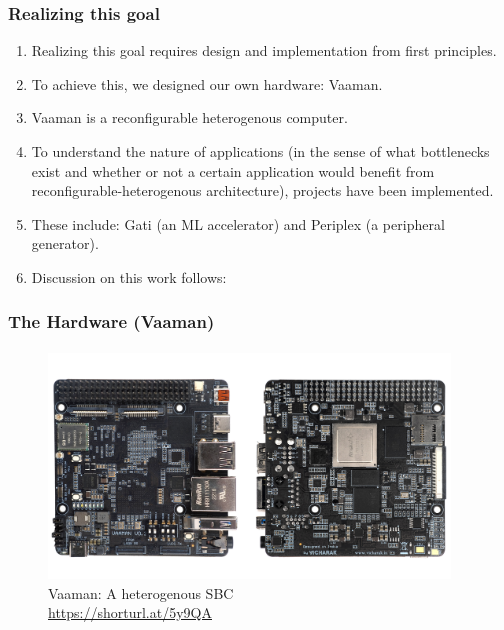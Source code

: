 \documentclass{beamer}
\begin{document}
{\begin{frame}[fragile]
  \frametitle{Realizing this goal}
  \begin{enumerate}
    \item Realizing this goal requires design and implementation from
      first principles.
    \item To achieve this, we designed our own hardware: Vaaman. 
    \item Vaaman is a reconfigurable heterogenous computer.
    \item To understand the nature of applications (in the sense of what
      bottlenecks exist and whether or not a certain application would
      benefit from reconfigurable-heterogenous architecture), projects have been implemented.
    \item These include: Gati (an ML accelerator) and Periplex (a peripheral
      generator).
    \item Discussion on this work follows:
  \end{enumerate}
  \framesubtitle{}
\end{frame}

\begin{frame}[fragile]
  \frametitle{The Hardware (Vaaman)}
  \framesubtitle{}
  \begin{figure}
    \centering
    \includegraphics[width=0.95\textwidth]{vaaman.jpg}
    \caption{Vaaman: A heterogenous SBC \\ \url{https://shorturl.at/5y9QA}}
    \label{neuron}
  \end{figure}
  
\end{frame}

}
\end{document}
